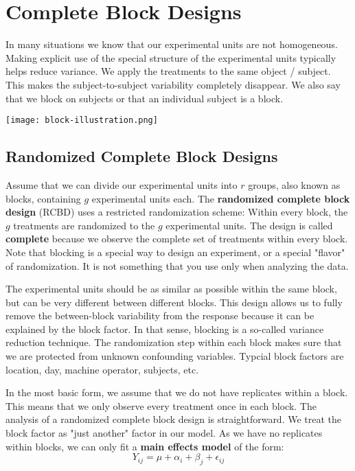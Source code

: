 \section{Complete Block Designs}

In many situations we know that our experimental units are not homogeneous. Making explicit use of the special structure of the experimental units typically helps reduce variance. We apply the treatments to the same object / subject. This makes the subject-to-subject variability completely disappear. We also say that we block on subjects or that an individual subject is a block.
\begin{center}
	\texttt{[image: block-illustration.png]}
\end{center}


\subsection{Randomized Complete Block Designs}

Assume that we can divide our experimental units into $r$ groups, also known as blocks, containing $g$ experimental units each. The \textbf{randomized complete block design} (RCBD) uses a restricted randomization scheme: Within every block, the $g$ treatments are randomized to the $g$ experimental units. The design is called \textbf{complete} because we observe the complete set of treatments within every block. Note that blocking is a special way to design an experiment, or a special "flavor" of randomization. It is not something that you use only when analyzing the data.\medskip

The experimental units should be as similar as possible within the same block, but can be very different between different blocks. This design allows us to fully remove the between-block variability from the response because it can be explained by the block factor. In that sense, blocking is a so-called variance reduction technique. The randomization step within each block makes sure that we are protected from unknown confounding variables. Typcial block factors are location, day, machine operator, subjects, etc. \medskip

In the most basic form, we assume that we do not have replicates within a block. This means that we only observe every treatment once in each block. The analysis of a randomized complete block design is straightforward. We treat the block factor as "just another" factor in our model. As we have no replicates within blocks, we can only fit a\textbf{ main effects model} of the form:
$$Y_{ij} = \mu + \alpha_i + \beta_j + \epsilon_{ij}$$

